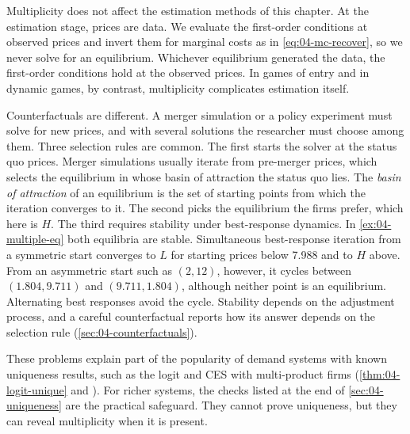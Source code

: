 Multiplicity does not affect the estimation methods of this chapter. At the estimation stage, prices are data. We
evaluate the first-order conditions at observed prices and invert them for marginal costs as in \eqref{eq:04-mc-recover},
so we never solve for an equilibrium. Whichever equilibrium generated the data, the first-order conditions hold at
the observed prices. In games of entry and in dynamic games, by contrast, multiplicity complicates estimation
itself.

Counterfactuals are different. A merger simulation or a policy experiment must solve for new prices, and with
several solutions the researcher must choose among them. Three selection rules are common. The first starts the
solver at the status quo prices. Merger simulations usually iterate from pre-merger prices, which selects the
equilibrium in whose basin of attraction the status quo lies. The \emph{basin of attraction} of an equilibrium is
the set of starting points from which the iteration converges to it. The second picks the equilibrium the firms prefer,
which here is $H$. The third requires stability under best-response dynamics. In \cref{ex:04-multiple-eq} both
equilibria are stable. Simultaneous best-response iteration from a symmetric start converges to $L$ for starting
prices below 7.988 and to $H$ above. From an asymmetric start such as $(2, 12)$, however, it cycles between
$(1.804, 9.711)$ and $(9.711, 1.804)$, although neither point is an equilibrium. Alternating best responses avoid
the cycle. Stability depends on the adjustment process, and a careful counterfactual reports how its answer depends
on the selection rule (\cref{sec:04-counterfactuals}).

These problems explain part of the popularity of demand systems with known uniqueness results, such as the logit and
CES with multi-product firms (\cref{thm:04-logit-unique} and \citealp{NockeSchutz2018}). For richer systems, the checks
listed at the end of \cref{sec:04-uniqueness} are the practical safeguard. They cannot prove uniqueness, but they can
reveal multiplicity when it is present.
